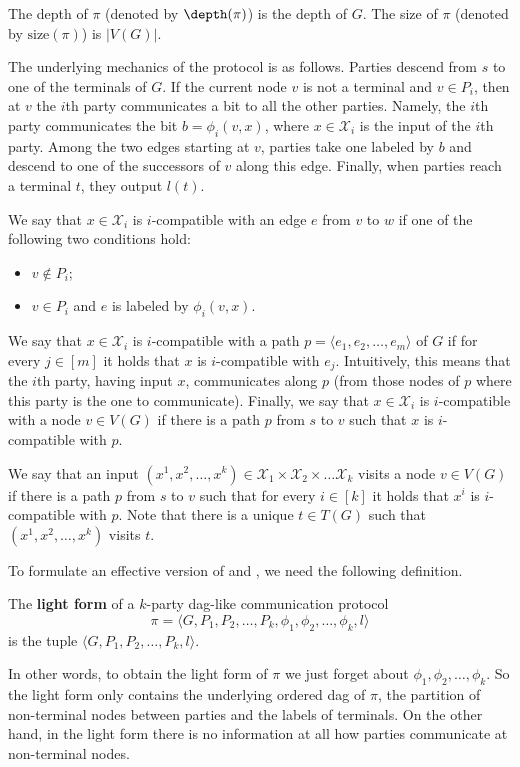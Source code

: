 The depth of $\pi$ (denoted by $\depth(\pi)$) is the depth of $G$. The size of $\pi$ (denoted by $\mathrm{size}(\pi)$) is  $|V(G)|$.


 The underlying mechanics of the protocol is as follows. Parties descend from $s$ to one of the terminals of $G$. If the current node $v$ is not a terminal and $v\in P_i$, then at $v$ the $i$th party communicates a bit to all the other parties. Namely, the $i$th party communicates the bit $b = \phi_i(v, x)$, where $x\in\mathcal{X}_i$ is the input of the $i$th party. Among the two edges starting at $v$, parties take one labeled by $b$ and descend to one of the successors of $v$ along this edge. Finally, when parties reach a terminal $t$, they output $l(t)$. 

We say that $x\in\mathcal{X}_i$ is $i$-compatible with an edge $e$ from
$v$ to $w$ if one of the following two %
conditions hold:  %
\begin{itemize}
\item $v\notin P_i$;
\item $v\in P_i$ and $e$ is labeled by $\phi_i(v, x)$.
\end{itemize}
We say that $x\in \mathcal{X}_i$ is $i$-compatible with  a path $p = \langle e_1, e_2, \ldots, e_m\rangle$ of $G$ if for every $j\in [m]$ it holds that $x$ is $i$-compatible with $e_j$. Intuitively, this means that the $i$th party, having input $x$, communicates along $p$ (from those nodes of $p$ where this party is the one to communicate).
Finally, we say that $x\in\mathcal{X}_i$ is $i$-compatible with a node $v\in V(G)$ if there is a path $p$ from $s$ to $v$ such that $x$ is $i$-compatible with $p$.

We say that an input  $(x^1, x^2, \ldots, x^k) \in \mathcal{X}_1 \times \mathcal{X}_2 \times \ldots \mathcal{X}_k$ visits a node $v\in V(G)$ if there is a path $p$ from $s$ to $v$ such that for every $i\in [k]$ it holds that $x^i$ is $i$-compatible with $p$. Note that there is a unique $t\in T(G)$ such that $(x^1, x^2, \ldots, x^k)$ visits $t$.





To formulate an effective version of  and , we need the following definition.
\begin{definition}
\label{light_form}
The \textbf{light form} of a $k$-party dag-like communication protocol
%
\[
\pi = \langle G, P_1, P_2, \ldots, P_k, \phi_1, \phi_2, \ldots, \phi_k, l\rangle
\]
is %
%
%
the  %
tuple $\langle G, P_1, P_2, \ldots, P_k, l\rangle$.
\end{definition}
%
In other words,  %
to obtain the light form of $\pi$ we just forget about $\phi_1, \phi_2, \ldots, \phi_k$. %
So  %
the light form only contains  the underlying ordered dag of $\pi$, the partition of non-terminal nodes between parties and the labels of terminals. On the other hand, in the light form there is no information at all how parties communicate at non-terminal nodes.



